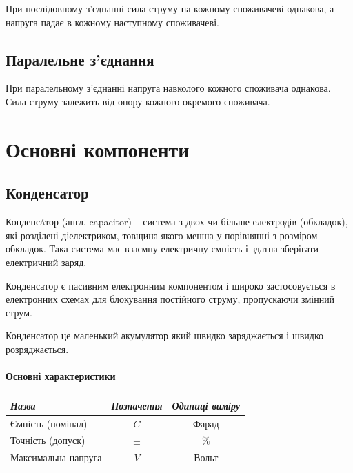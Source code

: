 \documentclass[12pt,a4paper]{report}  %
\begin{document}
При послідовному з'єднанні сила струму на кожному споживачеві однакова, а напруга падає в кожному наступному споживачеві.

\subsection{Паралельне з'єднання}

При паралельному з'єднанні напруга навколого кожного споживача однакова. Сила струму залежить від опору кожного окремого споживача.

\section{Основні компоненти}

\subsection{Конденсатор}

Конденсáтор (англ. capacitor) -- система з двох чи більше електродів (обкладок), які розділені діелектриком, товщина якого менша у порівнянні з розміром обкладок. Така система має взаємну електричну ємність і здатна зберігати електричний заряд.

Конденсатор є пасивним електронним компонентом і широко застосовується в електронних схемах для блокування постійного струму, пропускаючи змінний струм.

Конденсатор це маленький акумулятор який швидко заряджається і швидко розряджається.

\paragraph{Основні характеристики}


\begin{center}
\begin{tabular}{|l|c|c|}
\hline
\textit{Назва} & \textit{Позначення} & \textit{Одиниці виміру} \\
\hline
Ємність (номінал) & $C$ & Фарад \\
\hline
Точність (допуск) & $\pm$ & $ \% $ \\
\hline
Максимальна напруга & $V$ & Вольт \\
\hline
\end{tabular}
\end{center}
\end{document}
